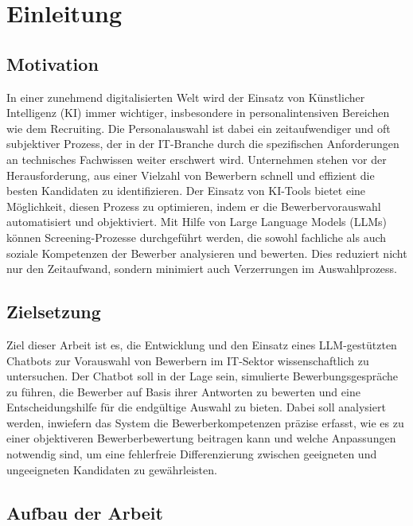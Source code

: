 
\chapter{Einleitung}

\section{Motivation}

In einer zunehmend digitalisierten Welt wird der Einsatz von Künstlicher Intelligenz (KI) immer wichtiger, insbesondere in personalintensiven Bereichen wie dem Recruiting. 
Die Personalauswahl ist dabei ein zeitaufwendiger und oft subjektiver Prozess, der in der IT-Branche durch die spezifischen Anforderungen an technisches Fachwissen weiter erschwert wird. 
Unternehmen stehen vor der Herausforderung, aus einer Vielzahl von Bewerbern schnell und effizient die besten Kandidaten zu identifizieren. 
Der Einsatz von KI-Tools bietet eine Möglichkeit, diesen Prozess zu optimieren, indem er die Bewerbervorauswahl automatisiert und objektiviert. 
Mit Hilfe von Large Language Models (LLMs) können Screening-Prozesse durchgeführt werden, die sowohl fachliche als auch soziale Kompetenzen der Bewerber analysieren und bewerten. 
Dies reduziert nicht nur den Zeitaufwand, sondern minimiert auch Verzerrungen im Auswahlprozess.

\section{Zielsetzung}

Ziel dieser Arbeit ist es, die Entwicklung und den Einsatz eines LLM-gestützten Chatbots zur Vorauswahl von Bewerbern im IT-Sektor wissenschaftlich zu untersuchen. 
Der Chatbot soll in der Lage sein, simulierte Bewerbungsgespräche zu führen, die Bewerber auf Basis ihrer Antworten zu bewerten und eine Entscheidungshilfe für die endgültige Auswahl zu bieten. 
Dabei soll analysiert werden, inwiefern das System die Bewerberkompetenzen präzise erfasst, wie es zu einer objektiveren Bewerberbewertung beitragen kann und welche Anpassungen notwendig sind, um eine fehlerfreie Differenzierung zwischen geeigneten und ungeeigneten Kandidaten zu gewährleisten.

\section{Aufbau der Arbeit}

